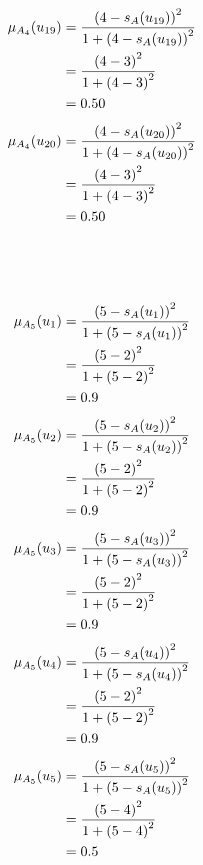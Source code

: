 \documentclass[a4paper]{book}
\begin{document}
				\begin{align}
					\mu_{A_4}(u_{19}) &= \frac{\left(4-s_A(u_{19})\right)^2}{1 + \left(4-s_A(u_{19})\right)^2}\\
					&= \frac{\left(4-3\right)^2}{1 + \left(4-3\right)^2} \notag \\
					&= 0.50 \notag
				\end{align}
				\begin{align}
					\mu_{A_4}(u_{20}) &= \frac{\left(4-s_A(u_{20})\right)^2}{1 + \left(4-s_A(u_{20})\right)^2}\\
					&= \frac{\left(4-3\right)^2}{1 + \left(4-3\right)^2} \notag \\
					&= 0.50 \notag
				\end{align}
				\\
				\\
				\\
				\begin{align}
					\mu_{A_5}(u_1) &= \frac{\left(5-s_A(u_1)\right)^2}{1 + \left(5-s_A(u_1)\right)^2}\\
					&= \frac{\left(5-2\right)^2}{1 + \left(5-2\right)^2} \notag \\
					&= 0.9 \notag
				\end{align}
				\begin{align}
					\mu_{A_5}(u_2) &= \frac{\left(5-s_A(u_2)\right)^2}{1 + \left(5-s_A(u_2)\right)^2}\\
					&= \frac{\left(5-2\right)^2}{1 + \left(5-2\right)^2} \notag \\
					&= 0.9 \notag
				\end{align}
				\begin{align}
					\mu_{A_5}(u_3) &= \frac{\left(5-s_A(u_3)\right)^2}{1 + \left(5-s_A(u_3)\right)^2}\\
					&= \frac{\left(5-2\right)^2}{1 + \left(5-2\right)^2} \notag \\
					&= 0.9 \notag
				\end{align}
				\begin{align}
					\mu_{A_5}(u_4) &= \frac{\left(5-s_A(u_4)\right)^2}{1 + \left(5-s_A(u_4)\right)^2}\\
					&= \frac{\left(5-2\right)^2}{1 + \left(5-2\right)^2} \notag \\
					&= 0.9 \notag
				\end{align}
				\begin{align}
					\mu_{A_5}(u_5) &= \frac{\left(5-s_A(u_5)\right)^2}{1 + \left(5-s_A(u_5)\right)^2}\\
					&= \frac{\left(5-4\right)^2}{1 + \left(5-4\right)^2} \notag \\
					&= 0.5 \notag
				\end{align}
\end{document}
